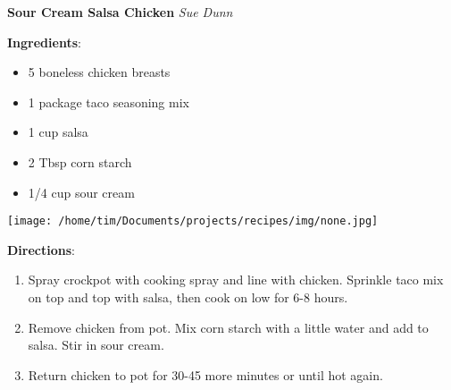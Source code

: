 \documentclass[11pt, twoside, openany]{book}
\begin{document}
\noindent\begin{minipage}[t]{\linewidth}%
{\Large\textbf{Sour Cream Salsa Chicken}} \label{sour-cream-salsa-chicken}\hfill\textit{Sue Dunn}\\
\noindent\begin{minipage}[t]{0.78\linewidth}%
\textbf{Ingredients}:\vspace{-3mm}
\begin{multicols}{2}
\begin{itemize}\setlength\itemsep{-1mm}
\item 5 boneless chicken breasts
\item 1 package taco seasoning mix
\item 1 cup salsa
\item 2 Tbsp corn starch
\item 1/4 cup sour cream
\end{itemize}
\end{multicols}
\end{minipage}
\noindent\begin{minipage}[t]{0.18\linewidth}
\centering \strut\vspace*{-\baselineskip}\newline
\texttt{[image: /home/tim/Documents/projects/recipes/img/none.jpg]}\\
\end{minipage}\vspace{3mm}
\textbf{Directions}:
\vspace{-3mm}\begin{enumerate}\setlength\itemsep{-1mm}
\item Spray crockpot with cooking spray and line with chicken. Sprinkle taco mix on top and top with salsa, then cook on low for 6-8 hours.
\item Remove chicken from pot. Mix corn starch with a little water and add to salsa. Stir in sour cream.
\item Return chicken to pot for 30-45 more minutes or until hot again.
\end{enumerate}
\end{minipage}\vspace{8mm}
\end{document}
